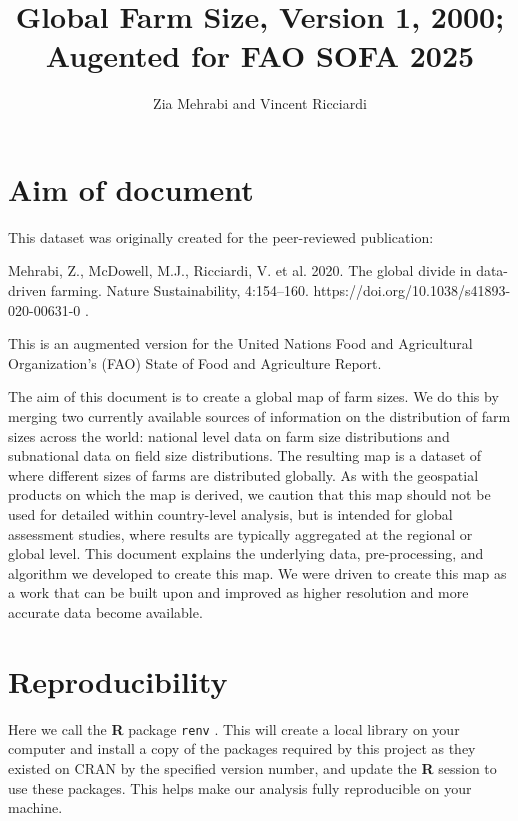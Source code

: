 \documentclass{article}
\title{Global Farm Size, Version 1, 2000; Augented for FAO SOFA 2025}
\author{Zia Mehrabi and Vincent Ricciardi}
\begin{document}





\maketitle

\tableofcontents

\newpage
\section{Aim of document}

This dataset was originally created for the peer-reviewed publication:

Mehrabi, Z., McDowell, M.J., Ricciardi, V. et al. 2020. The global divide in data-driven farming. Nature Sustainability, 4:154–160. https://doi.org/10.1038/s41893-020-00631-0 \cite{Mehrabi}.

This is an augmented version for the United Nations Food and Agricultural Organization's (FAO) State of Food and Agriculture Report.

The aim of this document is to create a global map of farm sizes. We do this by merging two currently available sources of information on the distribution of farm sizes across the world: national level data on farm size distributions and subnational data on field size distributions. The resulting map is a dataset of where different sizes of farms are distributed globally. As with the geospatial products on which the map is derived, we caution that this map should not be used for detailed within country-level analysis, but is intended for global assessment studies, where results are typically aggregated at the regional or global level. This document explains the underlying data, pre-processing, and algorithm we developed to create this map. We were driven to create this map as a work that can be built upon and improved as higher resolution and more accurate data become available.


\section{Reproducibility}
\label{reproducibility}

Here we call the  \textbf{R} package \texttt{renv} \cite{R-renv}. This will create a local library on your computer and install a copy of the packages required by this project as they existed on CRAN by the specified version number, and update the \textbf{R} session to use these packages. This helps make our analysis fully reproducible on your machine.
\end{document}

